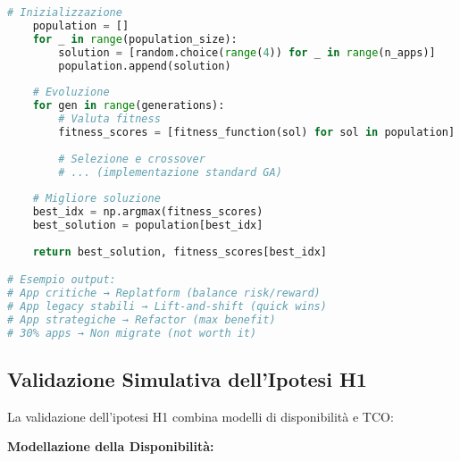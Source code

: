 \begin{lstlisting}[language=Python, caption=Ottimizzazione portfolio migrazione]
    # Inizializzazione
    population = []
    for _ in range(population_size):
        solution = [random.choice(range(4)) for _ in range(n_apps)]
        population.append(solution)
        
    # Evoluzione
    for gen in range(generations):
        # Valuta fitness
        fitness_scores = [fitness_function(sol) for sol in population]
        
        # Selezione e crossover
        # ... (implementazione standard GA)
        
    # Migliore soluzione
    best_idx = np.argmax(fitness_scores)
    best_solution = population[best_idx]
    
    return best_solution, fitness_scores[best_idx]

# Esempio output:
# App critiche → Replatform (balance risk/reward)
# App legacy stabili → Lift-and-shift (quick wins)
# App strategiche → Refactor (max benefit)
# 30% apps → Non migrate (not worth it)
\end{lstlisting}

\subsection{Validazione Simulativa dell'Ipotesi H1}

La validazione dell'ipotesi H1 combina modelli di disponibilità e TCO:

\textbf{Modellazione della Disponibilità:}

